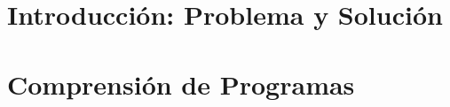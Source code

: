 \documentclass[a4paper,12pt]{report}
\begin{document}
%
%
%
%
%
%
\chapter{Introducción: Problema y Solución}

%
\chapter{Comprensión de Programas}

%
%
%
%
%
%
%
%
%
%
%
%
%
\end{document}
